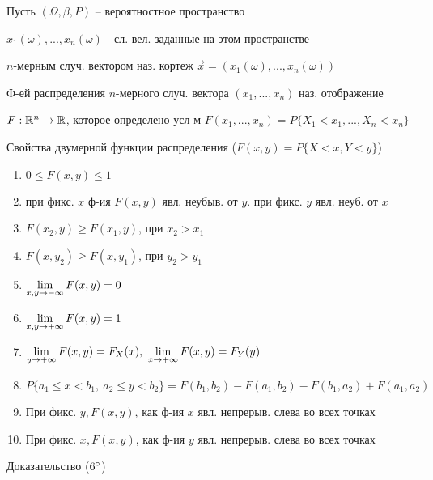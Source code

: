 
Пусть $(\Omega, \beta, P)$ -- вероятностное пространство

$x_1(\omega),...,x_n(\omega)$ - сл. вел. заданные на этом пространстве

\OPR $n$-мерным случ. вектором наз. кортеж $\overrightarrow{x} = (x_1(\omega),...,x_n(\omega))$

\OPR Ф-ей распределения $n$-мерного случ. вектора $(x_1,...,x_n)$ наз. отображение 

$F:\R^n\rightarrow\R$, которое определено усл-м $F(x_1,...,x_n)=P\{X_1<x_1,...,X_n<x_n\}$

Свойства двумерной функции распределения ($F(x,y)=P\{X<x, Y<y\}$)
\begin{enumerate}[topsep=0pt, leftmargin=20pt, noitemsep, label=\arabic*\degree]
	\item $0\leq F(x, y) \leq 1$
	
	\item при фикс. $x$ ф-ия $F(x, y)$ явл. неубыв. от $y$. при фикс. $y$ явл. неуб. от $x$
	\item [] $F(x_2,y)\geq F(x_1,y)$, при $x_2>x_1$
	\item [] $F(x,y_2)\geq F(x,y_1)$, при $y_2>y_1$
		
	\item $\liml_{\toinf[-]{x,y}}F(x, y) = 0$
	
	\item $\liml_{\toinf[+]{x,y}}F(x, y) = 1$
	
	\item $\liml_{\toinf[+]{y}}F(x,y)=F_{X}(x),~\liml_{\toinf[+]{x}}F(x,y)=F_{Y}(y)$
		
	\item $P\{a_1\leq x<b_1,~a_2\leq y<b_2\}=F(b_1,b_2)-F(a_1,b_2)-F(b_1,a_2)+F(a_1,a_2)$
	
	\item При фикс. $y, F(x,y)$, как ф-ия $x$ явл. непрерыв. слева во всех точках
	\item [] При фикс. $x, F(x,y)$, как ф-ия $y$ явл. непрерыв. слева во всех точках
\end{enumerate}

Доказательство ($6\degree$)


